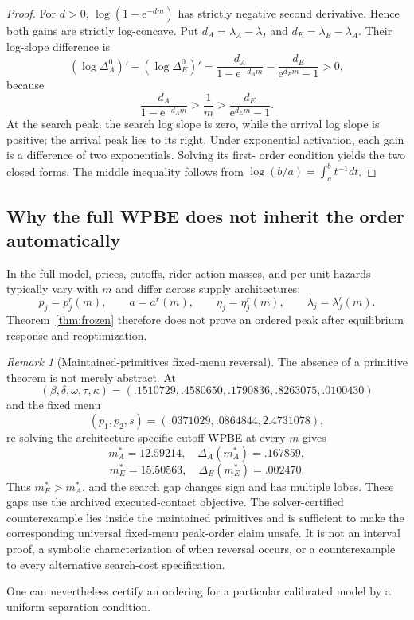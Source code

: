\documentclass[11pt]{article}
\theoremstyle{definition}
\theoremstyle{remark}
\newtheorem{remark}[theorem]{Remark}
\newcommand{\e}{\mathrm e}
\begin{document}
\begin{proof}
For $d>0$, $\log(1-\e^{-dm})$ has strictly negative second derivative.
Hence both gains are strictly log-concave.  Put
$d_A=\lambda_A-\lambda_I$ and $d_E=\lambda_E-\lambda_A$.  Their log-slope
difference is
\[
(\log\Delta_A^0)'-(\log\Delta_E^0)'
=\frac{d_A}{1-\e^{-d_A m}}
-\frac{d_E}{\e^{d_E m}-1}>0,
\]
because
\[
\frac{d_A}{1-\e^{-d_A m}}>\frac1m>
\frac{d_E}{\e^{d_E m}-1}.
\]
At the search peak, the search log slope is zero, while the arrival log slope
is positive; the arrival peak lies to its right.  Under exponential
activation, each gain is a difference of two exponentials.  Solving its first-
order condition yields the two closed forms.  The middle inequality follows
from
$\log(b/a)=\int_a^b t^{-1}dt$.
\end{proof}

\subsection{Why the full WPBE does not inherit the order automatically}

In the full model, prices, cutoffs, rider action masses, and per-unit hazards
typically vary with $m$ and differ across supply architectures:
\[
p_j=p_j^r(m),\qquad a=a^r(m),\qquad
\eta_j=\eta_j^r(m),\qquad \lambda_j=\lambda_j^r(m).
\]
Theorem~\ref{thm:frozen} therefore does not prove an ordered peak after
equilibrium response and reoptimization.

\begin{remark}[Maintained-primitives fixed-menu reversal]
The absence of a primitive theorem is not merely abstract.  At
\[
(\beta,\delta,\omega,\tau,\kappa)
=(.1510729,.4580650,.1790836,.8263075,.0100430)
\]
and the fixed menu
\[
(p_1,p_2,s)=(.0371029,.0864844,2.4731078),
\]
re-solving the architecture-specific cutoff-WPBE at every $m$ gives
\[
m_A^*=12.59214,\quad \Delta_A(m_A^*)=.167859,
\]
\[
m_E^*=15.50563,\quad \Delta_E(m_E^*)=.002470.
\]
Thus $m_E^*>m_A^*$, and the search gap changes sign and has multiple lobes.
These gaps use the archived executed-contact objective.  The solver-certified
counterexample lies inside the maintained primitives and is sufficient to make
the corresponding universal fixed-menu peak-order claim unsafe.  It is not an
interval proof, a symbolic characterization of when reversal occurs, or a
counterexample to every alternative search-cost specification.
\end{remark}

One can nevertheless certify an ordering for a particular calibrated model
by a uniform separation condition.
\end{document}
